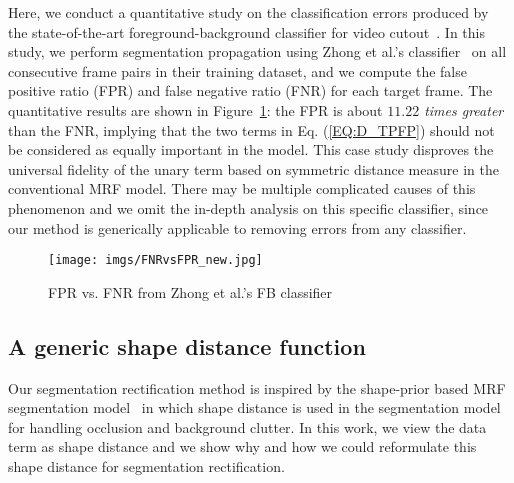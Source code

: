 \documentclass[10pt,journal,compsoc]{newIEEEtran}
\begin{document}
Here, we conduct a quantitative study on the classification errors produced by the state-of-the-art foreground-background classifier for video cutout~\cite{Zhong2012UDC_SIGGRAPHAsia}. In this study, we perform segmentation propagation using Zhong et al.'s classifier~\cite{Zhong2012UDC_SIGGRAPHAsia} on all consecutive frame pairs in their training dataset, and we compute the false positive ratio (FPR) and false negative ratio (FNR) for each target frame. The quantitative results are shown in Figure~\ref{FIG:StatEvid}: the FPR is about {\em $11.22$ times greater} than the FNR, implying that the two terms in Eq. (\ref{EQ:D_TPFP}) should not be considered as equally important in the model. This case study disproves the universal fidelity of the unary term based on symmetric distance measure in the conventional MRF model. There may be multiple complicated causes of this phenomenon and we omit the in-depth analysis on this specific classifier, since our method is generically applicable to removing errors from any classifier. 
\begin{figure}
	\centering
	\texttt{[image: imgs/FNRvsFPR\_new.jpg]}
	\caption{FPR vs. FNR from Zhong et al.'s FB classifier \cite{Zhong2012UDC_SIGGRAPHAsia}}\label{FIG:StatEvid}
\end{figure}\subsection{A generic shape distance function}
Our segmentation rectification method is inspired by the shape-prior based MRF segmentation model~\cite{Freedman2005ShapePriorGC,Vu2008Shape} in which shape distance is used in the segmentation model for handling occlusion and background clutter. In this work, we view the data term as shape distance and we show why and how we could reformulate this shape distance for segmentation rectification.
\end{document}
